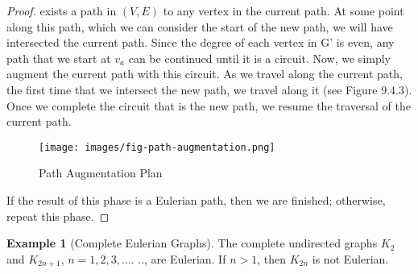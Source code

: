\documentclass[10pt,]{book}
\theoremstyle{plain}
\theoremstyle{definition}
\theoremstyle{definition}
\theoremstyle{definition}
\newtheorem{example}[theorem]{Example}
\theoremstyle{definition}
\theoremstyle{definition}
\numberwithin{equation}{section}
\begin{document}
\begin{proof}
exists a path in \((V, E)\) to any vertex in the current path. At some point along this path, which we can consider the start of the new path, we
will have intersected the current path. Since the degree of each vertex in G' is even, any path that we start at \(v_a\) can be continued until it
is a circuit. Now, we simply augment the current path with this circuit. As we travel along the current path, the first time that we intersect the
new path, we travel along it (see Figure 9.4.3). Once we complete the circuit that is the new path, we resume the traversal of the current path.%
\leavevmode%
\begin{figure}
\centering
\texttt{[image: images/fig-path-augmentation.png]}
\caption{Path Augmentation Plan
                \label{fig-path-augmentation}}
\end{figure}
\par
If the result of this phase is a Eulerian path, then we are finished; otherwise, repeat this phase.%
\end{proof}
\begin{example}[Complete Eulerian Graphs]\label{ex-complete-eulerian}
The complete undirected graphs \(K_2\) and \(K_{2n+1}\), \(n = 1, 2, 3, \ldots\). .., are Eulerian. If \(n>1\), then \(K_{2n}\)
is not Eulerian.
%
\end{example}
\typeout{************************************************}
\typeout{************************************************}
\end{document}
